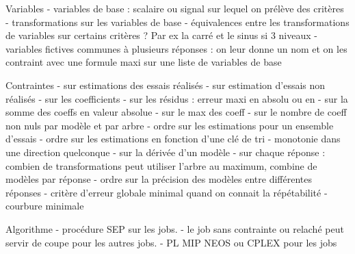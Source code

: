 Variables
- variables de base : scalaire ou signal sur lequel on prélève des critères
- transformations sur les variables de base
- équivalences entre les transformations de variables sur certains critères ? Par ex la carré et le sinus si 3 niveaux
- variables fictives communes à plusieurs réponses : on leur donne un nom et on les contraint avec une formule maxi sur une liste de variables de base

Contraintes
- sur estimations des essais réalisés
- sur estimation d'essais non réalisés
- sur les coefficients
- sur les résidus : erreur maxi en absolu ou en %
- sur la somme des coeffs en valeur absolue
- sur le max des coeff
- sur le nombre de coeff non nuls par modèle et par arbre
- ordre sur les estimations pour un ensemble d'essais
- ordre sur les estimations en fonction d'une clé de tri
- monotonie dans une direction quelconque
- sur la dérivée d'un modèle
- sur chaque réponse : combien de transformations peut utiliser l'arbre au maximum, combine de modèles par réponse
- ordre sur la précision des modèles entre différentes réponses
- critère d'erreur globale minimal quand on connait la répétabilité
- courbure minimale 

Algorithme
- procédure SEP sur les jobs.
- le job sans contrainte ou relaché peut servir de coupe pour les autres jobs.
- PL MIP NEOS ou CPLEX pour les jobs